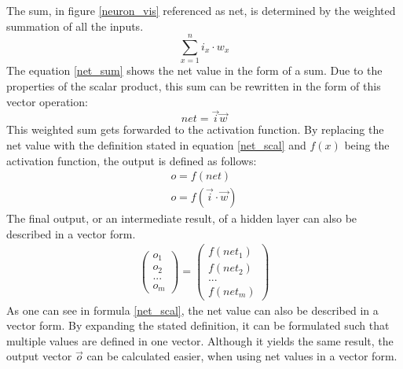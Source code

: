 \documentclass[12pt]{article}
\begin{document}
The sum, in figure \ref{neuron_vis} referenced as net, is determined by the weighted summation of all the  \glspl{input}. 
\begin{equation}
  \sum_{x = 1}^{n} i_{x} \cdot w_{x}  
  \label{net_sum}
\end{equation}
The equation \ref{net_sum} shows the \gls{net value} in the form of a sum.
Due to the properties of the \gls{scalar product}, this sum can be rewritten in the form of this \gls{vector} operation:
\begin{equation}
net = \vec{i}  \vec{w}
\label{net_scal}
\end{equation}
This weighted sum gets forwarded to the \gls{activation function}. By replacing the \gls{net value} with the definition stated in equation \ref{net_scal}  and $f(x)$ being the \gls{activation function}, the output is defined as follows:
\begin{equation}
\begin{gathered}
       o = f(net)\\
    o = f(\vec{i} \cdot \vec{w}) 
\end{gathered}
\end{equation}
The final output, or an intermediate result, of a \gls{hidden layer} can also be described in a vector form.
\begin{equation}
\begin{gathered}
      \begin{pmatrix}
o_{1}\\ 
o_{2}\\ 
...\\ 
o_{m}
\end{pmatrix} = \begin{pmatrix}
f(net_{1})\\ 
f(net_{2})\\ 
...\\ 
f(net_{m})
\end{pmatrix}
\end{gathered}
\end{equation}
As one can see in formula \ref{net_scal}, the \gls{net value} can also be described in a vector form. By expanding the stated definition, it can be formulated such that multiple values are defined in one \gls{vector}. Although it yields the same result, the output \gls{vector} $\vec{o}$ can be calculated easier, when using \glspl{net value} in a vector form.
\end{document}
